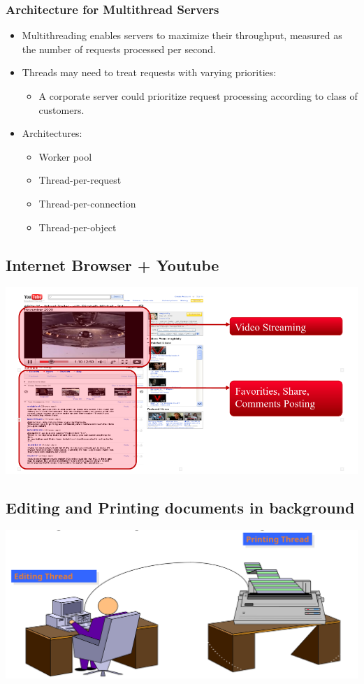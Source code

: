 \documentclass[12pt, a4paper]{book}
\begin{document}
\subsubsection{Architecture for Multithread Servers}
\begin{itemize}
    \item Multithreading enables servers to maximize their throughput, measured as the number of requests processed per second.
    \item Threads may need to treat requests with varying priorities:
          \begin{itemize}
              \item A corporate server could prioritize request processing according to class of customers.
          \end{itemize}
    \item Architectures:
          \begin{itemize}
              \item Worker pool
              \item Thread-per-request
              \item Thread-per-connection
              \item Thread-per-object
          \end{itemize}
\end{itemize}

\subsection{Internet Browser + Youtube}
\includegraphics[width=0.5\linewidth]{figures/youtube.png}

\subsection{Editing and Printing documents in background}
\includegraphics[width=0.5\linewidth]{figures/editing-and-print.png}
\end{document}
